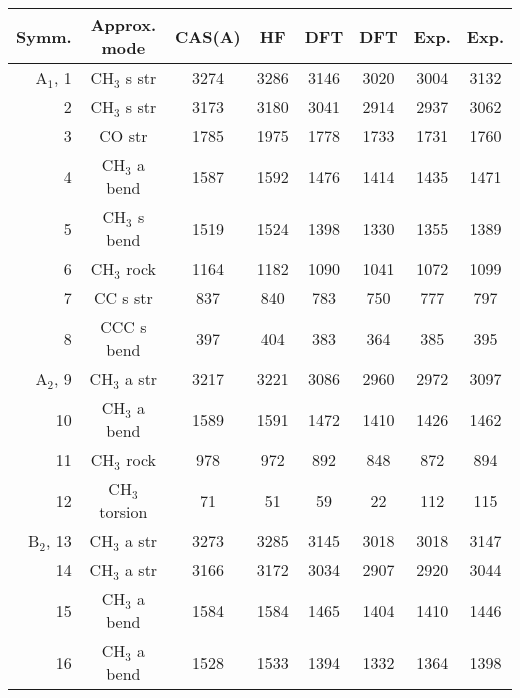 \begin{center}
\begin{threeparttable}
\footnotesize
\begin{tabular*}{\textwidth}{r@{\hspace*{10mm}}ccccccc}
\hline
Symm. & Approx. mode & 
CAS(A)\tnote{a} & HF\tnote{b} & DFT\tnote{b} & DFT\tnote{c}&
Exp.\tnote{d} & Exp.\tnote{e}  \\
\hline
A$_1$,  1 & CH$_3$ s str              & 3274 & 3286 & 3146 & 3020 & 3004 & 3132 \\
        2 & CH$_3$ s str              & 3173 & 3180 & 3041 & 2914 & 2937 & 3062 \\
        3 & CO str                    & 1785 & 1975 & 1778 & 1733 & 1731 & 1760 \\
        4 & CH$_3$ a bend             & 1587 & 1592 & 1476 & 1414 & 1435 & 1471 \\
        5 & CH$_3$ s bend             & 1519 & 1524 & 1398 & 1330 & 1355 & 1389 \\
        6 & CH$_3$ rock               & 1164 & 1182 & 1090 & 1041 & 1072 & 1099 \\
        7 & CC s str                  &  837 &  840 &  783 &  750 &  777 &  797 \\
        8 & CCC s bend                &  397 &  404 &  383 &  364 &  385 &  395 \\
A$_2$,  9 & CH$_3$ a str              & 3217 & 3221 & 3086 & 2960 & 2972 & 3097 \\
       10 & CH$_3$ a bend             & 1589 & 1591 & 1472 & 1410 & 1426 & 1462 \\
       11 & CH$_3$ rock               &  978 &  972 &  892 &  848 &  872 &  894 \\
       12 & CH$_3$ torsion            &   71 &   51 &   59 &   22 &  112 &  115 \\
B$_2$, 13 & CH$_3$ a str              & 3273 & 3285 & 3145 & 3018 & 3018 & 3147 \\
       14 & CH$_3$ a str              & 3166 & 3172 & 3034 & 2907 & 2920 & 3044 \\
       15 & CH$_3$ a bend             & 1584 & 1584 & 1465 & 1404 & 1410 & 1446 \\
       16 & CH$_3$ a bend             & 1528 & 1533 & 1394 & 1332 & 1364 & 1398 \\

\end{tabular*}
\end{threeparttable}
\end{center}
